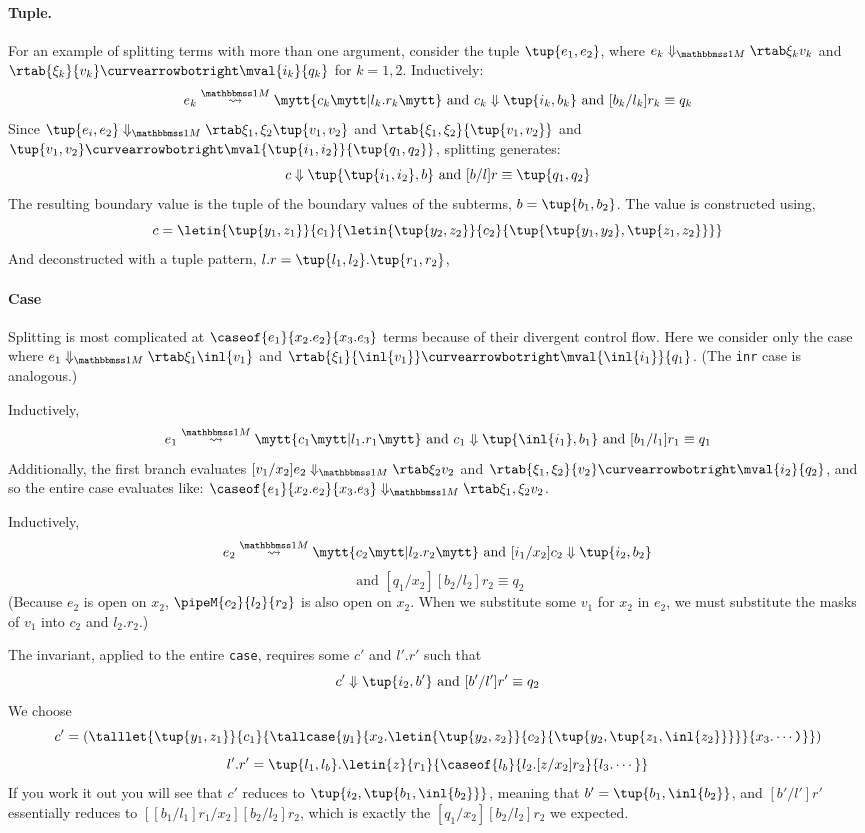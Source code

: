 \begin{abstrsyn}
\paragraph{Tuple.} For an example of splitting terms with more than one argument, consider the tuple $\tup{e_1,e_2}$,
where $\diaone {e_k} {\xi_k} {v_k}$ and 
$\rtab {\xi_k} {v_k} \vsplito \mval {i_k} {q_k}$ for $k = 1,2$.  
Inductively:
\[
	\splitone {e_k} A {c_k} {l_k.r_k} \text{ and } \reduce {c_k} {\tup{i_k,b_k}} \text{ and } [b_k/l_k]r_k \equiv q_k
\]
Since $\diaone {\tup{e_i,e_2}} {\xi_1,\xi_2} {\tup{v_1,v_2}}$ 
and $\rtab {\xi_1,\xi_2} {\tup{v_1,v_2}}$ and $\tup{v_1,v_2} \vsplito \mval {\tup{i_1,i_2}} {\tup{q_1,q_2}}$,
splitting generates:
\[
	\reduce {c} {\tup{\tup{i_1,i_2},b}} \text{ and } [b/l]r \equiv \tup{q_1,q_2}
\]
The resulting boundary value is the tuple of the boundary values of
the subterms, $b = \tup{b_1,b_2}$.  The value is 
constructed using,
\[
c = \letin{\tup{y_1,z_1}}{c_1}{\letin{\tup{y_2,z_2}}{c_2}{\tup{\tup{y_1, y_2},\tup{z_1, z_2}}}}
\]
And deconstructed with a tuple pattern, $l.r = \tup{l_1,l_2}.\tup{r_1,r_2}$,

\paragraph {Case}
Splitting is most complicated at $\caseof {e_1} {x_2.e_2} {x_3.e_3}$ terms because of their divergent control flow.
Here we consider only the case where
$\diaone {e_1} {\xi_1} {\inl {v_1}}$ and $\rtab {\xi_1} {\inl {v_1}} \vsplito \mval {\inl {i_1}} {q_1}$.
(The \texttt{inr} case is analogous.)

Inductively,
\[
	\splitone {e_1} A {c_1} {l_1.r_1} \text{ and } \reduce {c_1} {\tup{\inl {i_1},b_1}} \text{ and } [b_1/l_1]r_1 \equiv q_1
\]
Additionally, the first branch evaluates $\diaone {[v_1/x_2]e_2} {\xi_2} {v_2}$
and $\rtab {\xi_1,\xi_2} {v_2} \vsplito \mval {i_2} {q_2}$,
and so the entire case evaluates like:
$\diaone {\caseof {e_1} {x_2.e_2} {x_3.e_3}} {\xi_1,\xi_2} {v_2}$.

Inductively,
\[
	\splitone {e_2} A {c_2} {l_2.r_2} \text{ and } \reduce {[i_1/x_2]c_2} {\tup{i_2,b_2}} 
\]
\[
\text{ and } [q_1/x_2][b_2/l_2]r_2 \equiv q_2
\]
(Because $e_2$ is open on $x_2$, $\pipeM{c_2}{l_2}{r_2}$ is also open on $x_2$.
When we substitute some $v_1$ for $x_2$ in $e_2$, we must substitute the masks
of $v_1$ into $c_2$ and $l_2.r_2$.)

The invariant, applied to the entire \texttt{case}, requires some $c'$ and
$l'.r'$ such that 
\[
  \reduce {c'} {\tup{i_2,b'}} \text{ and }
  [b'/l']r' \equiv q_2
\]
We choose
\[
c' =
{\left(
\talllet{\tup{y_1,z_1}}{c_1}{
\tallcase{y_1}
{x_2.\letin{\tup{y_2,z_2}}{c_2}{\tup{y_2,\tup{z_1,\inl{z_2}}}}}
{x_3.\cdots\ttrpar}
}\right)}
\]
\[
l'.r' =
\tup{l_1,l_b}.\letin{z}{r_1}{\caseof{l_b}{l_2.[z/x_2]{r_2}}{l_3.\cdots}}
\]
If you work it out you will see that $c'$ reduces to
$\tup{i_2,\tup{b_1,\inl{b_2}}}$, meaning that 
$b' = \tup{b_1,\inl{b_2}}$, and
$[b'/l']r'$ essentially reduces to
$[[b_1/l_1]r_1/x_2][b_2/l_2]r_2$, which is exactly the 
$[q_1/x_2][b_2/l_2]r_2$ we expected.


\end{abstrsyn}
